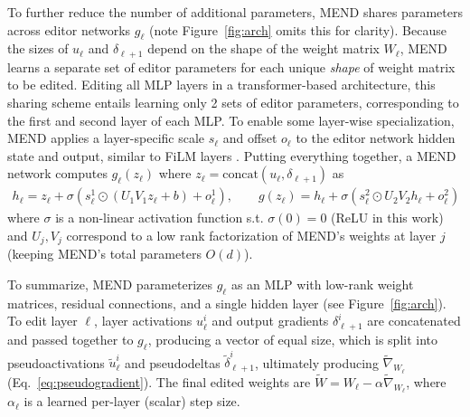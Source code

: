\documentclass{article}
\makeatletter
\newcommand{\name}{MEND}
\newcommand{\rebuttal}[1]{#1}
\let\origsubsection\subsection
\renewcommand\subsection{\@ifstar{\starsubsection}{\nostarsubsection}}
\newcommand\nostarsubsection[1]
{\subsectionprelude\origsubsection{#1}\subsectionpostlude}
\newcommand\starsubsection[1]
{\subsectionprelude\origsubsection*{#1}\subsectionpostlude}
\newcommand\subsectionprelude{%
  \vspace{-1.5mm}
}
\newcommand\subsectionpostlude{%
  \vspace{-1.5mm}
}
\makeatother
\begin{document}
To further reduce the number of additional parameters, {\name} shares parameters across editor networks $g_\ell$ (note Figure~\ref{fig:arch} omits this for clarity). Because the sizes of $u_\ell$ and $\delta_{\ell+1}$ depend on the shape of the weight matrix $W_\ell$, {\name} learns a separate set of editor parameters for each unique \textit{shape} of weight matrix to be edited. Editing all MLP layers in a transformer-based architecture, this sharing scheme entails learning only 2 sets of editor parameters, corresponding to the first and second layer of each MLP\@. To enable some layer-wise specialization, {\name} applies a layer-specific scale $s_\ell$ and offset $o_\ell$ to the editor network hidden state and output,  similar to FiLM layers \citep{perez2018film}. Putting everything together, a {\name} network computes $g_\ell(z_\ell)$ where $z_\ell =\text{concat}(u_\ell, \delta_{\ell+1})$ as
\begin{subequations}
    \label{eq:mend-forward}
    \begin{gather}
        h_\ell  = z_\ell  + \sigma(s^1_\ell \odot (U_1V_1 z_\ell + b) + o^1_\ell),\quad\quad
        g(z_\ell) = h_\ell + \sigma(s^2_\ell \odot U_2V_2 h_\ell + o^2_\ell) \tag{\theequation a,b}
    \end{gather}
\end{subequations}
where $\sigma$ is a non-linear activation function s.t. $\sigma(0) = 0$ (ReLU in this work) and $U_j,V_j$ correspond to \rebuttal{a low rank factorization of \name's weights at layer $j$ (keeping \name's total parameters $O(d)$).}

To summarize, {\name} parameterizes $g_\ell$ as an MLP with low-rank weight matrices, residual connections, and a single hidden layer (see Figure~\ref{fig:arch}). To edit layer $\ell$, layer activations $u_\ell^i$ and output gradients $\delta_{\ell+1}^i$ are concatenated and passed together to $g_\ell$, producing a vector of equal size, which is split into pseudoactivations $\tilde u_\ell^i$ and pseudodeltas $\tilde \delta_{\ell+1}^i$, ultimately producing $\tilde{\nabla}_{W_\ell}$ (Eq.~\ref{eq:pseudogradient}). The final edited weights are $\tilde W = W_\ell - \alpha\tilde{\nabla}_{W_\ell}$, where $\alpha_\ell$ is a learned per-layer (scalar) step size.

\subsection{Training \name}
\end{document}
